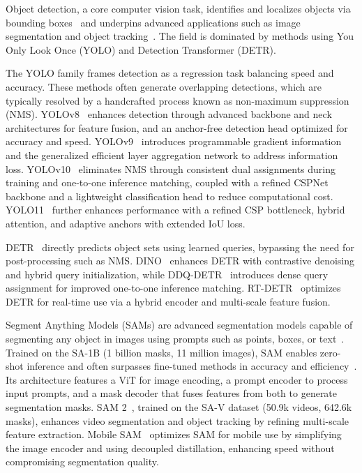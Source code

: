Object detection, a core computer vision task, identifies and localizes objects via bounding boxes~\cite{zou2023object} and underpins advanced applications such as image segmentation and object tracking~\cite{wang2022sygnet,ma2024rethinking,li2024CPDR}. The field is dominated by methods using You Only Look Once (YOLO) and Detection Transformer (DETR). 

The YOLO family frames detection as a regression task balancing speed and accuracy. These methods often generate overlapping detections, which are typically resolved by a handcrafted process known as non-maximum suppression (NMS). YOLOv8~\cite{yolov8} enhances detection through advanced backbone and neck architectures for feature fusion, and an anchor-free detection head optimized for accuracy and speed. YOLOv9~\cite{yolov9} introduces programmable gradient information and the generalized efficient layer aggregation network to address information loss. YOLOv10~\cite{yolov10} eliminates NMS through consistent dual assignments during training and one-to-one inference matching, coupled with a refined CSPNet backbone and a lightweight classification head to reduce computational cost. YOLO11~\cite{yolo11} further enhances performance with a refined CSP bottleneck, hybrid attention, and adaptive anchors with extended IoU loss.

DETR~\cite{carion2020end} directly predicts object sets using learned queries, bypassing the need for post-processing such as NMS. DINO~\cite{zhang2022dino} enhances DETR with contrastive denoising and hybrid query initialization, while DDQ-DETR~\cite{zhang2023dense} introduces dense query assignment for improved one-to-one inference matching. RT-DETR~\cite{zhao2024detrs} optimizes DETR for real-time use via a hybrid encoder and multi-scale feature fusion.


Segment Anything Models (SAMs) are advanced segmentation models capable of segmenting any object in images using prompts such as points, boxes, or text~\cite{kirillov2023segment,ravi2024sam,mobile_sam}. Trained on the SA-1B (1 billion masks, 11 million images), SAM enables zero-shot inference and often surpasses fine-tuned methods in accuracy and efficiency~\cite{kirillov2023segment}. Its architecture features a ViT for image encoding, a prompt encoder to process input prompts, and a mask decoder that fuses features from both to generate segmentation masks. SAM 2~\cite{ravi2024sam}, trained on the SA-V dataset (50.9k videos, 642.6k masks), enhances video segmentation and object tracking by refining multi-scale feature extraction. Mobile SAM~\cite{mobile_sam} optimizes SAM for mobile use by simplifying the image encoder and using decoupled distillation, enhancing speed without compromising segmentation quality.


